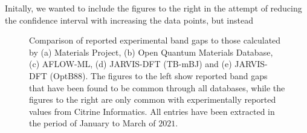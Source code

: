 Initally, we wanted to include the figures to the right in the attempt of
reducing the confidence interval with increasing the data points, but instead


\clearpage
\begin{figure}[ht!]
    \centering
    \begin{subfigure}[t]{1\textwidth}
        \centering
        
        \caption{}
    \end{subfigure}%

    \begin{subfigure}[t]{1\textwidth}
        \centering
        
        \caption{}
    \end{subfigure}

    \begin{subfigure}[t]{1\textwidth}
        \centering
        
        \caption{}
    \end{subfigure}
\end{figure}

\begin{figure}[t!]\ContinuedFloat
    \centering
    \begin{subfigure}[t]{1\textwidth}
        \centering
        
        \caption{}
    \end{subfigure}%

    \begin{subfigure}[t]{1\textwidth}
        \centering
        
        \caption{}
    \end{subfigure}
    \vspace*{-130mm}
    \caption{Comparison of reported experimental band gaps to those calculated by (a) Materials Project, (b) Open Quantum Materials Database, (c) AFLOW-ML, (d) JARVIS-DFT (TB-mBJ) and (e) JARVIS-DFT (OptB88). The figures to the left show reported band gaps that have been found to be common through all databases, while the figures to the right are only common with experimentally reported values from Citrine Informatics. All entries have been extracted in the period of January to March of $2021$. }
    \label{fig:band gaps}
\end{figure}

